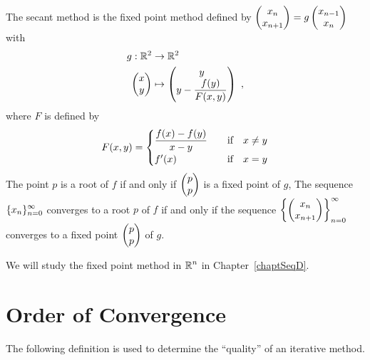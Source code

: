 \begin{rmk}
The secant method is the fixed point method defined by
$\displaystyle
\begin{pmatrix} x_n \\ x_{n+1} \end{pmatrix}
= g\begin{pmatrix} x_{n-1}\\ x_n \end{pmatrix}$
with
\begin{align*}
g:\mathbb{R}^2 &\rightarrow \mathbb{R}^2 \\
\
\begin{pmatrix} x \\ y \end{pmatrix}
&\mapsto
\begin{pmatrix}
y \\ 
\displaystyle y - \frac{f(y)}{F(x,y)}
\end{pmatrix} \ ,
\end{align*}
where $F$ is defined by
\[
F(x,y) = \begin{cases}
\displaystyle \frac{f(x)-f(y)}{x-y} & \quad \text{if} \quad x\neq y \\
f'(x) & \quad \text{if} \quad x = y
\end{cases}
\]
The point $p$ is a root of $f$ if and only if
$\displaystyle \begin{pmatrix} p \\ p \end{pmatrix}$ is a fixed point
of $g$,  The sequence $\displaystyle \{x_n\}_{n=0}^\infty$ converges
to a root $p$ of $f$ if and only if the sequence
$\displaystyle \left\{ \begin{pmatrix} x_n \\
x_{n+1} \end{pmatrix}\right\}_{n=0}^\infty$ 
converges to a fixed point
$\displaystyle \begin{pmatrix} p \\ p \end{pmatrix}$  of $g$.

We will study the fixed point method in $\displaystyle \mathbb{R}^n$ in
Chapter~\ref{chaptSeqD}.
\label{secantFP}
\end{rmk}

\section{Order of Convergence} \label{OrderConvNBmeth}

The following definition is used to determine the ``quality'' of an
iterative method.

